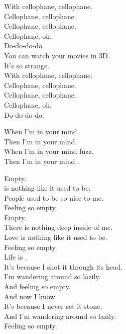 With cellophane, cellophane. \\
Cellophane, cellophane. \\
Cellophane, cellophane. \\
Cellophane, oh. \\
Do-do-do-do. \\

You can watch your movies in 3D. \\
It's so strange. \\

With cellophane, cellophane. \\
Cellophane, cellophane. \\
Cellophane, cellophane. \\
Cellophane, oh. \\
Do-do-do-do. \\




When I'm in your mind. \\
Then I'm in your mind. \\
When I'm in your mind fuzz. \\
Then I'm in your mind . \\




Empty. \\
 is nothing like it used to be. \\
People used to be so nice to me. \\
Feeling so empty. \\
Empty. \\
There is nothing deep inside of me. \\
Love is nothing like it used to be. \\
Feeling so empty. \\

Life is . \\
It's because I shot it through its head. \\
I'm wandering around so lazily. \\
And feeling so empty. \\
And now I know. \\
It's because I never set it stone. \\
And I'm wandering around so lazily. \\
Feeling so empty. \\

